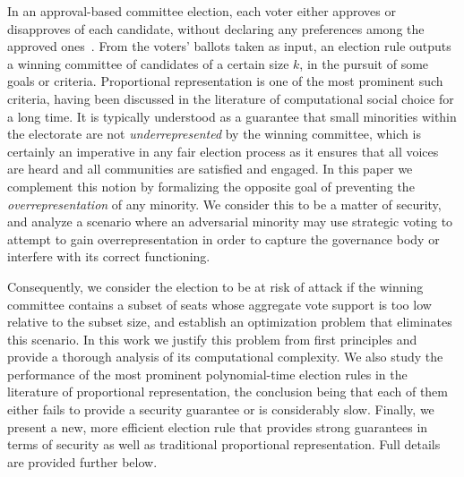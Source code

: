 



In an approval-based committee election, each voter either approves or disapproves of each candidate, without declaring any preferences among the approved ones~\cite{lackner2020approval}. From the voters' ballots taken as input, an election rule outputs a winning committee of candidates of a certain size $k$, in the pursuit of some goals or criteria. Proportional representation is one of the most prominent such criteria, having been discussed in the literature of computational social choice for a long time. It is typically understood as a guarantee that small minorities within the electorate are not \emph{underrepresented} by the winning committee, which is certainly an imperative in any fair election process as it ensures that all voices are heard and all communities are satisfied and engaged. 
In this paper we complement this notion by formalizing the opposite goal of preventing the \emph{overrepresentation} of any minority. We consider this to be a matter of security, and analyze a scenario where an adversarial minority may use strategic voting to attempt to gain overrepresentation in order to capture the governance body or interfere with its correct functioning. 

Consequently, we consider the election to be at risk of attack if the winning committee contains a subset of seats whose aggregate vote support is too low relative to the subset size, and establish an optimization problem that eliminates this scenario. 
In this work we justify this problem from first principles and provide a thorough analysis of its computational complexity. 
We also study the performance of the most prominent polynomial-time election rules in the literature of proportional representation, the conclusion being that each of them either fails to provide a security guarantee or is considerably slow. Finally, we present a new, more efficient election rule that provides strong guarantees in terms of security as well as traditional proportional representation. Full details are provided further below.


